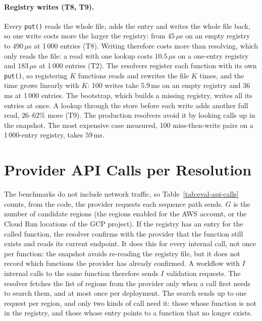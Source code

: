 \paragraph{Registry writes (T8, T9).}
Every \texttt{put()} reads the whole file, adds the entry and writes the whole file back, so one
write costs more the larger the registry: from $45\,\mu$s on an empty registry to $490\,\mu$s at
1\,000 entries (T8). Writing therefore costs more than resolving, which only reads the file: a
read with one lookup costs $10.5\,\mu$s on a one-entry registry and $183\,\mu$s at 1\,000 entries
(T2). The resolvers register each function with its own \texttt{put()}, so registering $K$
functions reads and rewrites the file $K$ times, and the time grows linearly with $K$: 100 writes
take 5.9\,ms on an empty registry and 36\,ms at 1\,000 entries. The bootstrap, which builds a
missing registry, writes all its entries at once. A lookup through the store before each write adds another full
read, $26$--$62\%$ more (T9). The production resolvers avoid it by looking calls up in the snapshot.
The most expensive case measured, 100 miss-then-write pairs on a 1\,000-entry registry, takes
$59$\,ms.

\section{Provider API Calls per Resolution}
\label{sec:eval-api-calls}

The benchmarks do not include network traffic, so Table~\ref{tab:eval-api-calls} counts, from the
code, the provider requests each sequence path sends. $G$ is the number of candidate regions (the
regions enabled for the AWS account, or the Cloud Run locations of the GCP project). If the
registry has an entry for the called function, the resolver confirms with the provider that the
function still exists and reads its current endpoint. It does this for every internal call, not once per function: the
snapshot avoids re-reading the registry file, but it does not record which functions the provider has already confirmed. A
workflow with $I$ internal calls to the same function therefore sends $I$ validation requests. The
resolver fetches the list of regions from the provider only when a call first needs to search
them, and at most once per deployment. The search sends up to one request per region, and only
two kinds of call need it: those whose function is not in the registry, and those whose entry points to
a function that no longer exists.

